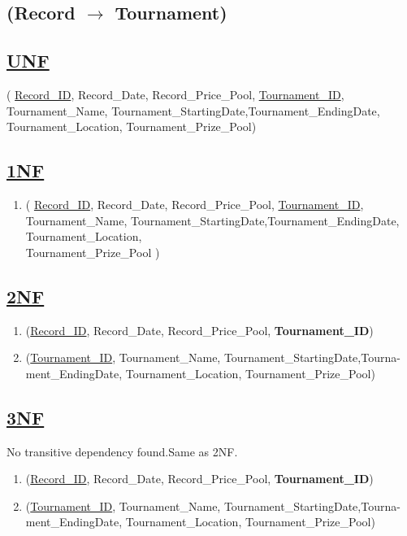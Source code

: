 \subsection{\texorpdfstring{\centering (Record $\rightarrow$ Tournament)}{(Record - Tournament)}}

\subsection*{\underline{UNF}}
(
\underline{Record\_ID}, Record\_Date, Record\_Price\_Pool,
\underline{Tournament\_ID}, Tournament\_Name, Tournament\_StartingDate,Tournament\_EndingDate, Tournament\_Location, Tournament\_Prize\_Pool)


\subsection*{\underline{1NF}}

\begin{enumerate}
    \item
          (
          \underline{Record\_ID}, Record\_Date, Record\_Price\_Pool,
          \underline{Tournament\_ID}, Tournament\_Name, Tournament\_StartingDate,Tournament\_EndingDate, Tournament\_Location, \\Tournament\_Prize\_Pool
          )
\end{enumerate}


\subsection*{\underline{2NF}}
\begin{enumerate}
    \item (\underline{Record\_ID}, Record\_Date, Record\_Price\_Pool, \textbf{Tournament\_ID})
    \item (\underline{Tournament\_ID}, Tournament\_Name, Tournament\_StartingDate,Tourna-\\ment\_EndingDate, Tournament\_Location, Tournament\_Prize\_Pool)
\end{enumerate}

\subsection*{\underline{3NF}}
No transitive dependency found.Same as 2NF.
\begin{enumerate}
    \item (\underline{Record\_ID}, Record\_Date, Record\_Price\_Pool, \textbf{Tournament\_ID})
    \item (\underline{Tournament\_ID}, Tournament\_Name, Tournament\_StartingDate,Tourna-\\ment\_EndingDate, Tournament\_Location, Tournament\_Prize\_Pool)
\end{enumerate}

